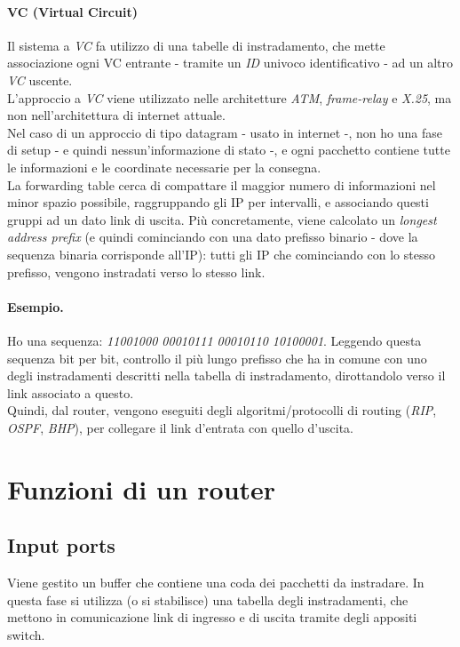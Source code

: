 \paragraph{VC (Virtual Circuit)}
Il sistema a \textit{VC} fa utilizzo di una tabelle di instradamento, che mette associazione ogni VC entrante - tramite un \textit{ID} univoco identificativo - ad un altro \textit{VC} uscente. \\
L'approccio a \textit{VC} viene utilizzato nelle architetture \textit{ATM}, \textit{frame-relay} e \textit{X.25}, ma non nell'architettura di internet attuale. \hfill \\

Nel caso di un approccio di tipo datagram - usato in internet -, non ho una fase di setup - e quindi nessun'informazione di stato -, e ogni pacchetto contiene tutte le informazioni  e le coordinate necessarie per la consegna. \\
La forwarding table cerca di compattare il maggior numero di informazioni nel minor spazio possibile, raggruppando gli IP per intervalli, e associando questi gruppi ad un dato link di uscita. Più concretamente, viene calcolato un \textit{longest address prefix} (e quindi cominciando con una dato prefisso binario - dove la sequenza binaria corrisponde all'IP): tutti gli IP che cominciando con lo stesso prefisso, vengono instradati verso lo stesso link.

\paragraph{Esempio.}
Ho una sequenza: \textit{11001000 00010111 00010110 10100001}. Leggendo questa sequenza bit per bit, controllo il più lungo prefisso che ha in comune con uno degli instradamenti descritti nella tabella di instradamento, dirottandolo verso il link associato a questo. \hfill \\

Quindi, dal router, vengono eseguiti degli algoritmi/protocolli di routing (\textit{RIP}, \textit{OSPF}, \textit{BHP}), per collegare il link d'entrata con quello d'uscita.

\section{Funzioni di un router}
\subsection{Input ports}
Viene gestito un buffer che contiene una coda dei pacchetti da instradare. In questa fase si utilizza (o si stabilisce) una tabella degli instradamenti, che mettono in comunicazione link di ingresso e di uscita tramite degli appositi switch.
